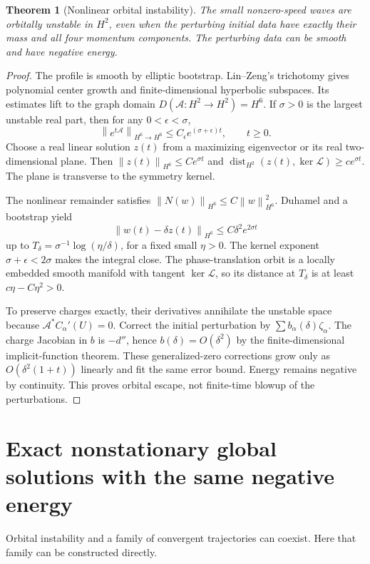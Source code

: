 \documentclass[11pt,a4paper]{article}
\newtheorem{theorem}{Theorem}[section]
\theoremstyle{remark}\newtheorem{remark}[theorem]{Remark}
\newcommand{\norm}[1]{\left\|#1\right\|}
\newcommand{\dist}{\operatorname{dist}}\newcommand{\Span}{\operatorname{span}}
\begin{document}
\begin{theorem}[Nonlinear orbital instability]
The small nonzero-speed waves are orbitally unstable in $H^2$, even when the perturbing initial data have exactly their mass and all four momentum components. The perturbing data can be smooth and have negative energy.
\end{theorem}
\begin{proof}
The profile is smooth by elliptic bootstrap. Lin--Zeng's trichotomy gives polynomial center growth and finite-dimensional hyperbolic subspaces. Its estimates lift to the graph domain $D(\mathcal A:H^2\to H^2)=H^6$. If $\sigma>0$ is the largest unstable real part, then for any $0<\epsilon<\sigma$,
\[
 \norm{e^{t\mathcal A}}_{H^6\to H^6}\le C_\epsilon e^{(\sigma+\epsilon)t},\qquad t\ge0.
\]
Choose a real linear solution $z(t)$ from a maximizing eigenvector or its real two-dimensional plane. Then $\norm{z(t)}_{H^6}\le Ce^{\sigma t}$ and $\dist_{H^2}(z(t),\ker\mathcal L)\ge ce^{\sigma t}$. The plane is transverse to the symmetry kernel.

The nonlinear remainder satisfies $\norm{N(w)}_{H^6}\le C\norm w_{H^6}^2$. Duhamel and a bootstrap yield
\[
 \norm{w(t)-\delta z(t)}_{H^6}\le C\delta^2e^{2\sigma t}
\]
up to $T_\delta=\sigma^{-1}\log(\eta/\delta)$, for a fixed small $\eta>0$. The kernel exponent $\sigma+\epsilon<2\sigma$ makes the integral close. The phase-translation orbit is a locally embedded smooth manifold with tangent $\ker\mathcal L$, so its distance at $T_\delta$ is at least $c\eta-C\eta^2>0$.

To preserve charges exactly, their derivatives annihilate the unstable space because $\mathcal A^*C_\alpha'(U)=0$. Correct the initial perturbation by $\sum b_\alpha(\delta)\zeta_\alpha$. The charge Jacobian in $b$ is $-d''$, hence $b(\delta)=O(\delta^2)$ by the finite-dimensional implicit-function theorem. These generalized-zero corrections grow only as $O(\delta^2(1+t))$ linearly and fit the same error bound. Energy remains negative by continuity. This proves orbital escape, not finite-time blowup of the perturbations.
\end{proof}

\section{Exact nonstationary global solutions with the same negative energy}
Orbital instability and a family of convergent trajectories can coexist. Here that family can be constructed directly.
\end{document}
